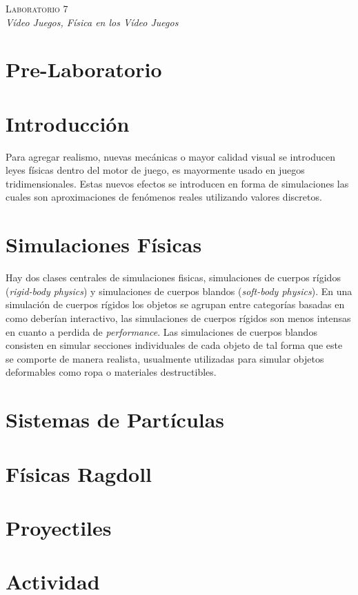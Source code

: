 \begin{center}
\textsc{\Large Laboratorio 7}~\\
\emph{\large Vídeo Juegos, Física en los Vídeo Juegos}
\end{center}

\section{Pre-Laboratorio}

\section{Introducción}
Para agregar realismo, nuevas mecánicas o mayor calidad visual se introducen leyes físicas dentro del motor de juego, es mayormente usado en juegos tridimensionales. Estas nuevos efectos se introducen en forma de simulaciones las cuales son aproximaciones de fenómenos reales utilizando valores discretos.

\section{Simulaciones Físicas}
Hay dos clases centrales de simulaciones fisicas, simulaciones de cuerpos rígidos (\emph{rigid-body physics}) y simulaciones de cuerpos blandos (\emph{soft-body physics}). En una simulación de cuerpos rígidos los objetos se agrupan entre categorías basadas en como deberían interactivo, las simulaciones de cuerpos rígidos son menos intensas en cuanto a perdida de \emph{performance}. Las simulaciones de cuerpos blandos consisten en simular secciones individuales de cada objeto de tal forma que este se comporte de manera realista, usualmente utilizadas para simular objetos deformables como ropa o materiales destructibles.

\section{Sistemas de Partículas}


\section{Físicas Ragdoll}

\section{Proyectiles}

\section{Actividad}
